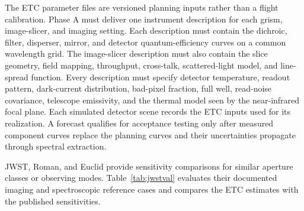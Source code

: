 The ETC parameter files are versioned planning inputs rather than a flight calibration. Phase A must deliver one instrument description for each grism, image-slicer, and imaging setting. Each description must contain the dichroic, filter, disperser, mirror, and detector quantum-efficiency curves on a common wavelength grid. The image-slicer description must also contain the slice geometry, field mapping, throughput, cross-talk, scattered-light model, and line-spread function. Every description must specify detector temperature, readout pattern, dark-current distribution, bad-pixel fraction, full well, read-noise covariance, telescope emissivity, and the thermal model seen by the near-infrared focal plane. Each simulated detector scene records the ETC inputs used for its realization. A forecast qualifies for acceptance testing only after measured component curves replace the planning curves and their uncertainties propagate through spectral extraction.

JWST, Roman, and Euclid provide sensitivity comparisons for similar aperture classes or observing modes. Table~\ref{tab:jwstval} evaluates their documented imaging and spectroscopic reference cases and compares the ETC estimates with the published sensitivities.

